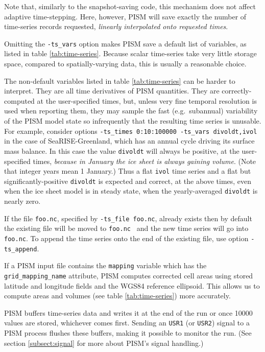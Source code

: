 Note that, similarly to the snapshot-saving code, this mechanism does not affect adaptive time-stepping.  Here, however, PISM will save exactly the number of time-series records requested, \emph{linearly interpolated onto requested times}.

Omitting the \texttt{-ts_vars} option makes PISM save a default list of variables, as listed in table \ref{tab:time-series}.  Because scalar time-series take very little storage space, compared to spatially-varying data, this is usually a reasonable choice.

The non-default variables listed in table \ref{tab:time-series} can be harder to interpret.  They are all time derivatives of PISM quantities.  They are correctly-computed at the user-specified times, but, unless very fine temporal resolution is used when reporting them, they may sample the fast (e.g.~subannual) variability of the PISM model state so infrequently that the resulting time series is unusable.  For example, consider options \texttt{-ts_times 0:10:100000 -ts_vars divoldt,ivol} in the case of SeaRISE-Greenland, which has an annual cycle driving its surface mass balance.  In this case the value \texttt{divoldt} will always be positive, at the user-specified times, \emph{because in January the ice sheet is always gaining volume}.  (Note that integer years mean 1 January.)  Thus a flat \texttt{ivol} time series and a flat but significantly-positive \texttt{divoldt} is expected and correct, at the above times, even when the ice sheet model is in steady state, when the yearly-averaged \texttt{divoldt} is nearly zero.

If the file \texttt{foo.nc}, specified by \texttt{-ts_file foo.nc}, already exists then by default the existing file will be moved to \texttt{foo.nc~} and the new time series will go into \texttt{foo.nc}.  To append the time series onto the end of the existing file, use option \texttt{-ts_append}.

If a PISM input file contains the \texttt{mapping} variable which has the
\texttt{grid_mapping_name} attribute, PISM computes corrected cell areas
using stored latitude and longitude fields and the WGS84 reference ellipsoid.
This allows us to compute areas and volumes (see table \ref{tab:time-series})
more accurately.

PISM buffers time-series data and writes it at the end of the run or once 10000
values are stored, whichever comes first. Sending an \texttt{USR1} (or
\texttt{USR2}) signal to a PISM process flushes these buffers, making it
possible to monitor the run. (See section \ref{subsect:signal} for more about
PISM's signal handling.)

